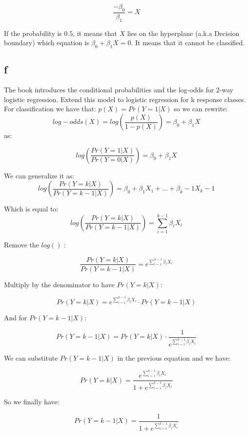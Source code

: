 \[ \frac{-\beta_0}{\beta_1} = X \]

If the probability is $0.5 $, it means that $X$ lies on the hyperplane (a.k.a Decision boundary) which equation is $ \beta_0 + \beta_1 X = 0 $. It means that it cannot be classified. 

\subsection*{f}

The book introduces the conditional probabilities and the log-odds for 2-way logistic regression. Extend this model to logistic regression for k response classes.\\

For classification we have that: $ p(X) = Pr(Y = 1 | X)$ so we can rewrite:\\
\[ log-odds(X) = log(\frac{p(X)}{1 - p(X)}) = \beta_0 + \beta_1 X   \]
as:
  
\[ log(\frac{Pr(Y = 1 | X)}{Pr(Y = 0 | X)}) = \beta_0 + \beta_1 X  \]

We can generalize it as:
 \[ log(\frac{Pr(Y = k | X)}{Pr(Y = k-1 | X)}) = \beta_0 + \beta_1 X_1 + ... + \beta_k-1 X_k-1  \]

Which is equal to:
\[ log(\frac{Pr(Y = k | X)}{Pr(Y = k-1 | X)}) = \sum_{i = 1}^{k-1} \beta_i X_i  \]

Remove the $ log()$ :

\[ \frac{Pr(Y = k | X)}{Pr(Y = k-1 | X)} = e^{\sum_{i = 1}^{k-1} \beta_i X_i} \]  

Multiply by the denominator to have $ Pr(Y = k | X) $: 

\[ Pr(Y = k | X) = e^{\sum_{i = 1}^{k-1} \beta_i X_i} \cdot Pr(Y = k-1 | X) \]

And for $ Pr(Y = k-1 | X) $: 

\[ Pr(Y = k-1 | X) = Pr(Y = k | X) \cdot \frac{1}{e^{\sum_{i = 1}^{k-1} \beta_i X_i}} \] 

We can substitute $ Pr(Y = k - 1 | X) $ in the previous equation and we have:

\[ Pr(Y = k | X) = \frac{e^{\sum_{i = 1}^{k-1} \beta_i X_i}}{1 + e^{\sum_{i = 1}^{k-1} \beta_i X_i}} \]

So we finally have: 

\[ Pr(Y = k-1 | X) = \frac{1}{1 + e^{\sum_{i = 1}^{k-1} \beta_i X_i}} \]









